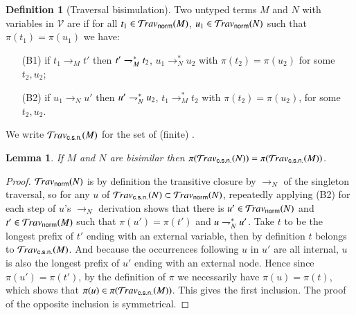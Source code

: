\documentclass{elsarticle}
\theoremstyle{plain}
\newtheorem{lemma}[theorem]{Lemma}
\theoremstyle{definition}
\newtheorem{definition}{Definition}[section]
\newcommand{\normalizing}{{\sf norm}}
\newcommand{\travsetnorm}{\travset_\normalizing} %
\newcommand{\travsetscn}{\travset_{\sf c.s.n.}} %
\def\coresymbol{\pi} %
\newcommand{\core}[1]{\coresymbol(#1)} %
\begin{document}
\begin{definition}[Traversal bisimulation]
\label{def:bisimilar_terms}
Two untyped terms $M$ and $N$ with variables in $\mathcal{V}$
 are  if
for all $t_1 \in \travsetnorm(M)$, $u_1 \in \travsetnorm(N)$ such that
$\core{t_1} = \core{u_1}$ we have:
\begin{itemize}[nosep]
    \item[(B1)]
    if $t_1 \rightarrow_M t'$ then
        $t' \rightharpoondown_M^* t_2$,
        $u_1 \rightarrow^*_N u_2$
        with $\core{t_2} = \core{u_2}$
        for some $t_2, u_2$;
    \item[(B2)]
    if $u_1 \rightarrow_N u'$ then
      $u' \rightharpoondown_N^* u_2$,
      $t_1 \rightarrow^*_M t_2$
      with $\core{t_2} = \core{u_2}$,
       for some $t_2,u_2$.
\end{itemize}
\end{definition}


We write $\travsetscn(M)$ for the set of (finite) .

\begin{lemma}
\label{lem:bisimulation_isomorphism}
If $M$ and $N$ are bisimilar
then $\coresymbol(\travsetscn(N)) = \coresymbol(\travsetscn(M))$.
\end{lemma}
\begin{proof}
$\travsetnorm(N)$ is by definition the transitive closure by $\rightarrow_N$ of the singleton traversal,
so for any $u$ of $\travsetscn(N) \subset \travsetnorm(N)$, repeatedly applying (B2) for each step of $u$'s $\rightarrow_N$ derivation shows that there is $u' \in \travsetnorm(N)$ and  $t' \in \travsetnorm(M)$
such that $\core{u'} = \core{t'}$
and $u \rightharpoondown_N^* u'$.
Take $t$ to be the longest prefix of $t'$ ending with an external variable, then by definition $t$ belongs to $\travsetscn(M)$.
And because the occurrences following $u$ in $u'$ are all internal, $u$ is also the longest prefix of $u'$ ending with an external node.
Hence since $\core{u'} = \core{t'}$, by the definition of
$\coresymbol$ we necessarily have $\core{u} = \core{t}$, which shows that
$\core{u}\in \core{\travsetscn(M)}$.
This gives the first inclusion.
The proof of the opposite inclusion is symmetrical.
\end{proof}
\end{document}
